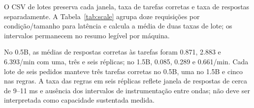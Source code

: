 O CSV de lotes preserva cada janela, taxa de tarefas corretas e taxa de respostas separadamente. A Tabela~\ref{tab:scale} agrupa doze requisições por condição/tamanho para latência e calcula a média de duas taxas de lote; os intervalos permanecem no resumo legível por máquina.

No 0.5B, as médias de respostas corretas às tarefas foram 0.871, 2.883 e 6.393/min com uma, três e seis réplicas; no 1.5B, 0.085, 0.289 e 0.661/min. Cada lote de seis pedidos manteve três tarefas corretas no 0.5B, uma no 1.5B e cinco nas regras. A taxa das regras em seis réplicas reflete janela de respostas de cerca de 9--11 ms e ausência dos intervalos de instrumentação entre ondas; não deve ser interpretada como capacidade sustentada medida.
